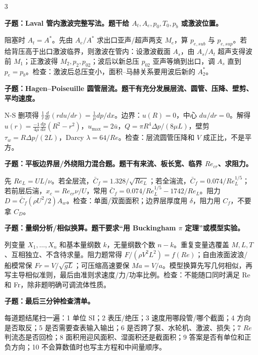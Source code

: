 \documentclass[a4paper]{article}
\newcommand{\qt}[1]{\vspace{0.10pt}\colorbox{Q}{\parbox{\dimexpr\linewidth-2\fboxsep}{\color{white}\bfseries #1}}\par}
\newcommand{\ans}[1]{\colorbox{G}{\parbox{\dimexpr\linewidth-2\fboxsep}{#1}}\par}
\begin{document}
\begin{multicols}{3}
\qt{子题：Laval 管内激波完整写法。题干给 $A_t,A_e,p_0,T_0,p_b$ 或激波位置。}
\ans{阻塞时 $A_t=A^*$。先由 $A_e/A^*$ 求出口亚声/超声两支 $M_e$，算 $p_{e,sub}$ 与 $p_{e,sup}$。若给背压高于出口激波临界，则激波在管内：设激波截面 $A_s$，由 $A_s/A_t$ 超声支得波前 $M_1$；正激波得 $M_2,p_2,p_{02}$；波后以新总压 $p_{02}$ 亚声等熵到出口，调 $A_s$ 直到 $p_e=p_b$。检查：激波后总压变小，面积--马赫关系要用波后新的 $A_2^*$。}
\qt{子题：Hagen--Poiseuille 圆管层流。题干有充分发展层流、圆管、压降、壁剪、平均速度。}
\ans{N-S 删项得 $\frac1r\frac d{dr}(rdu/dr)=\frac1\mu dp/dx$。边界：$u(R)=0$，中心 $du/dr=0$。解得 $u(r)=\frac{-1}{4\mu}\frac{dp}{dx}(R^2-r^2)$，$u_{\max}=2\bar u$，$Q=\pi R^4\Delta p/(8\mu L)$，壁剪 $\tau_w=R\Delta p/(2L)$，Darcy $\lambda=64/Re$。检查：层流圆管压降和 $V$ 成正比，不是平方。}
\qt{子题：平板边界层/外绕阻力混合题。题干有来流、板长宽、临界 $Re_{cr}$、求阻力。}
\ans{先 $Re_L=UL/\nu$。若全层流，$\bar C_f=1.328/\sqrt{Re_L}$；若全湍流，$\bar C_f=0.074/Re_L^{1/5}$；若前层后湍，$x_c=Re_{cr}\nu/U$，常用 $\bar C_f=0.074/Re_L^{1/5}-1742/Re_L$。阻力 $D=\bar C_f(\rho U^2/2)A_w$。检查：单面/双面面积；边界层厚度用 $\delta$，阻力用 $C_f$，不要拿 $C_D$。}
\qt{子题：量纲分析/相似换算。题干要求“用 Buckingham $\pi$ 定理”或模型实验。}
\ans{列变量 $X_1,\dots,X_n$ 和基本量纲数 $k$，无量纲数个数 $n-k$。重复变量选覆盖 $M,L,T$、互相独立、不含待求量。阻力题常得 $F/(\rho V^2L^2)=f(Re)$；自由液面波浪/船模常保 $Fr=V/\sqrt{gL}$；可压缩高速要保 $Ma=V/a$。模型换算先写几何相似，再写主导相似准则，最后由准则求速度/力/功率比例。检查：不能随口同时满足 Re 和 Fr，除非题明确可调流体性质。}
\qt{子题：最后三分钟检查清单。}
\ans{每道题结尾扫一遍：1 单位 SI；2 表压/绝压；3 速度用哪段管/哪个截面；4 方向是否取反；5 是否需要查表输入输出；6 是否跨了泵、水轮机、激波、损失；7 $Re$ 判流态是否回检；8 面积用迎风面积、湿面积还是截面积；9 答案是否有单位和正负方向；10 不会算数值时也写主方程和中间量顺序。}


\end{multicols}
\end{document}
